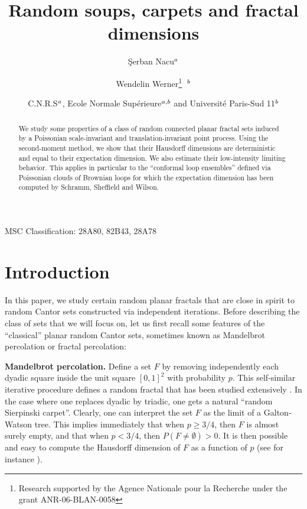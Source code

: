 \documentclass[11pt]{article}
\begin{document}
\title{Random soups, carpets and fractal dimensions}
\author{\c Serban Nacu${\null}^a$ \and Wendelin Werner\footnote {Research supported by the Agence Nationale pour la Recherche under the grant ANR-06-BLAN-0058}$ \hskip 6pt {\null}^b$}
\date {C.N.R.S${\null}^{a}$, Ecole Normale Sup\'erieure${\null}^{a,b}$ and Universit\'e Paris-Sud 11$\null^{b}$}
\maketitle

\begin {abstract}
We study some properties of a class of random connected 
planar fractal sets induced by a Poissonian scale-invariant and translation-invariant point process.
 Using the second-moment method, we show that their 
Hausdorff dimensions are deterministic and equal to their 
expectation dimension. We also estimate their low-intensity limiting behavior. 
This applies in particular to the ``conformal loop ensembles'' defined via Poissonian clouds of Brownian loops
 for which the expectation dimension
 has been computed by Schramm, Sheffield and Wilson.
\end {abstract}

MSC Classification: 28A80, 82B43, 28A78

\section{Introduction}

In this paper, we study certain random planar fractals that are close in spirit 
to random Cantor sets constructed via independent iterations.
Before describing the class of sets that we will focus on, let us first 
recall some features of  the ``classical'' planar random Cantor sets,
 sometimes known as Mandelbrot percolation or fractal percolation:

\medbreak


{\bf Mandelbrot percolation.}
Define a set $F$ by removing independently each dyadic square 
inside the unit square $[0,1]^2$ with probability $p$. 
This self-similar iterative procedure defines a random fractal that has been studied extensively \cite {Ma, MR, CCD, Fa, BC0}. 
In the case where one replaces dyadic by triadic, one gets a natural ``random Sierpinski carpet''.
Clearly, one can interpret the set $F$ as the limit of a Galton-Watson tree. This implies immediately that when $p \ge 3/4$, then $F$ is almost surely empty, and that when $p < 3/4$, then $P ( F \not= \emptyset )  > 0$.
It is then possible and easy to compute the Hausdorff dimension of $F$ as a function of $p$  (see for instance \cite {Fa}). 
\end{document}
